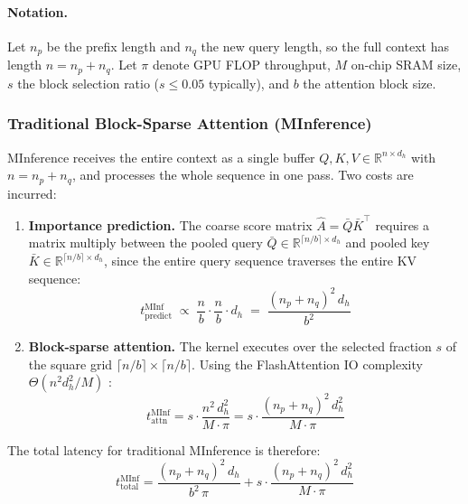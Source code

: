 \documentclass{article}
\begin{document}
\paragraph{Notation.}
Let $n_p$ be the prefix length and $n_q$ the new query length, so the
full context has length $n = n_p + n_q$. Let $\pi$ denote GPU FLOP
throughput, $M$ on-chip SRAM size, $s$ the block selection ratio
($s \leq 0.05$ typically), and $b$ the attention block size.

\subsubsection*{Traditional Block-Sparse Attention (MInference)}

MInference receives the entire context as a single buffer
$Q, K, V \in \mathbb{R}^{n \times d_h}$ with $n = n_p + n_q$, and
processes the whole sequence in one pass. Two costs are incurred:

\begin{enumerate}
  \item \textbf{Importance prediction.} The coarse score matrix
    $\hat{A} = \bar{Q}\bar{K}^\top$ requires a matrix multiply between
    the pooled query $\bar{Q} \in \mathbb{R}^{\lceil n/b \rceil \times d_h}$
    and pooled key $\bar{K} \in \mathbb{R}^{\lceil n/b \rceil \times d_h}$,
    since the entire query sequence traverses the entire KV sequence:
    \begin{equation}
      t_{\text{predict}}^{\text{MInf}}
      \;\propto\; \frac{n}{b} \cdot \frac{n}{b} \cdot d_h
      \;=\; \frac{(n_p + n_q)^2\,d_h}{b^2}
      \label{eq:t-pred-minf}
    \end{equation}

  \item \textbf{Block-sparse attention.} The kernel executes over the
    selected fraction $s$ of the square grid
    $\lceil n/b \rceil \times \lceil n/b \rceil$. Using the FlashAttention
    IO complexity $\Theta(n^2 d_h^2 / M)$ \cite{flashattention}:
    \begin{equation}
      t_{\text{attn}}^{\text{MInf}}
      = s \cdot \frac{n^2\,d_h^2}{M \cdot \pi}
      = s \cdot \frac{(n_p + n_q)^2\,d_h^2}{M \cdot \pi}
      \label{eq:t-minf-attn}
    \end{equation}
\end{enumerate}

The total latency for traditional MInference is therefore:
\begin{equation}
  t_{\text{total}}^{\text{MInf}}
  = \frac{(n_p+n_q)^2\,d_h}{b^2\,\pi}
    + s \cdot \frac{(n_p+n_q)^2\,d_h^2}{M \cdot \pi}
  \label{eq:t-minf-total}
\end{equation}
\end{document}
